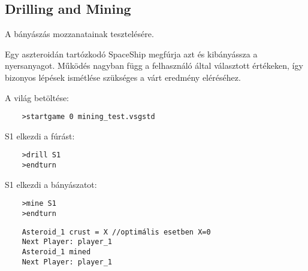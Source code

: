 \documentclass[../../projlab]{subfiles}
\begin{document}
\subsection{Drilling and Mining}
\begin{test-case-description}
    A bányászás mozzanatainak tesztelésére.
\end{test-case-description}
\begin{test-case-function}
    Egy aszteroidán tartózkodó SpaceShip megfúrja azt és kibányássza a nyersanyagot. \newline
    Működés nagyban függ a felhasználó által választott értékeken, így bizonyos lépések ismétlése szükséges a várt eredmény eléréséhez.
\end{test-case-function}
\begin{test-case-input}

    A világ betöltése: 
    \begin{verbatim}
    >startgame 0 mining_test.vsgstd
    \end{verbatim}
    S1 elkezdi a fúrást: 
    \begin{verbatim}
    >drill S1
    >endturn
    \end{verbatim}
    S1 elkezdi a bányászatot: 
    \begin{verbatim}
    >mine S1
    >endturn
    \end{verbatim}
\end{test-case-input}
\begin{test-case-output}
\begin{verbatim}
    Asteroid_1 crust = X //optimális esetben X=0
    Next Player: player_1
    Asteroid_1 mined
    Next Player: player_1
\end{verbatim}
\end{test-case-output}
\end{document}
